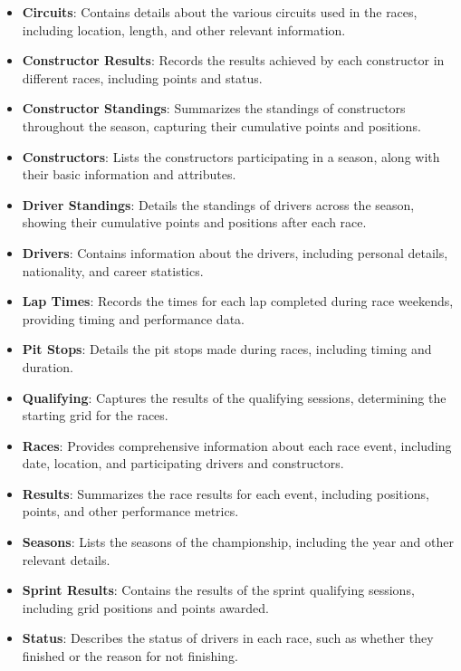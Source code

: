\documentclass{article}
\begin{document}
\begin{itemize}
    \item \textbf{Circuits}: Contains details about the various circuits used in the races, including location, length, and other relevant information.
    \item \textbf{Constructor Results}: Records the results achieved by each constructor in different races, including points and status.
    \item \textbf{Constructor Standings}: Summarizes the standings of constructors throughout the season, capturing their cumulative points and positions.
    \item \textbf{Constructors}: Lists the constructors participating in a season, along with their basic information and attributes.
    \item \textbf{Driver Standings}: Details the standings of drivers across the season, showing their cumulative points and positions after each race.
    \item \textbf{Drivers}: Contains information about the drivers, including personal details, nationality, and career statistics.
    \item \textbf{Lap Times}: Records the times for each lap completed during race weekends, providing timing and performance data.
    \item \textbf{Pit Stops}: Details the pit stops made during races, including timing and duration.
    \item \textbf{Qualifying}: Captures the results of the qualifying sessions, determining the starting grid for the races.
    \item \textbf{Races}: Provides comprehensive information about each race event, including date, location, and participating drivers and constructors.
    \item \textbf{Results}: Summarizes the race results for each event, including positions, points, and other performance metrics.
    \item \textbf{Seasons}: Lists the seasons of the championship, including the year and other relevant details.
    \item \textbf{Sprint Results}: Contains the results of the sprint qualifying sessions, including grid positions and points awarded.
    \item \textbf{Status}: Describes the status of drivers in each race, such as whether they finished or the reason for not finishing.
\end{itemize}
\end{document}
